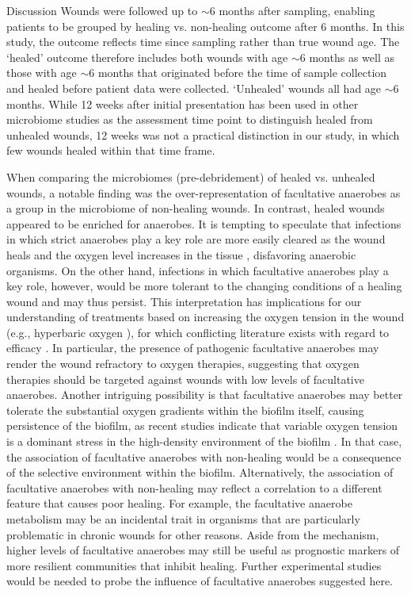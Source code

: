 \documentclass[oneside,12pt,final]{sty/ucthesis-CA2012}
\begin{document}
\begin{mainmatter}
\begin{section}{Discussion}
Wounds were followed up to $\sim 6$ months after sampling, enabling patients to be grouped by healing vs. non-healing outcome after 6 months. In this study, the outcome reflects time since sampling rather than true wound age. The ‘healed’ outcome therefore includes both wounds with age $\sim 6$ months as well as those with age $\sim 6$ months that originated before the time of sample collection and healed before patient data were collected. ‘Unhealed’ wounds all had age $\sim 6$ months. While 12 weeks after initial presentation has been used in other microbiome studies \cite{RN7, RN8} as the assessment time point to distinguish healed from unhealed wounds, 12 weeks was not a practical distinction in our study, in which few wounds healed within that time frame. 

When comparing the microbiomes (pre-debridement) of healed vs. unhealed wounds, a notable finding was the over-representation of facultative anaerobes as a group in the microbiome of non-healing wounds. In contrast, healed wounds appeared to be enriched for anaerobes. It is tempting to speculate that infections in which strict anaerobes play a key role are more easily cleared as the wound heals and the oxygen level increases in the tissue \cite{RN38}, disfavoring anaerobic organisms. On the other hand, infections in which facultative anaerobes play a key role, however, would be more tolerant to the changing conditions of a healing wound and may thus persist. This interpretation has implications for our understanding of treatments based on increasing the oxygen tension in the wound (e.g., hyperbaric oxygen \cite{RN39}), for which conflicting literature exists with regard to efficacy \cite{RN31}. In particular, the presence of pathogenic facultative anaerobes may render the wound refractory to oxygen therapies, suggesting that oxygen therapies should be targeted against wounds with low levels of facultative anaerobes. Another intriguing possibility is that facultative anaerobes may better tolerate the substantial oxygen gradients within the biofilm itself, causing persistence of the biofilm, as recent studies indicate that variable oxygen tension is a dominant stress in the high-density environment of the biofilm \cite{RN50, RN49}. In that case, the association of facultative anaerobes with non-healing would be a consequence of the selective environment within the biofilm. Alternatively, the association of facultative anaerobes with non-healing may reflect a correlation to a different feature that causes poor healing. For example, the facultative anaerobe metabolism may be an incidental trait in organisms that are particularly problematic in chronic wounds for other reasons. Aside from the mechanism, higher levels of facultative anaerobes may still be useful as prognostic markers of more resilient communities that inhibit healing. Further experimental studies would be needed to probe the influence of facultative anaerobes suggested here.


\end{section}
\end{mainmatter}
\end{document}
